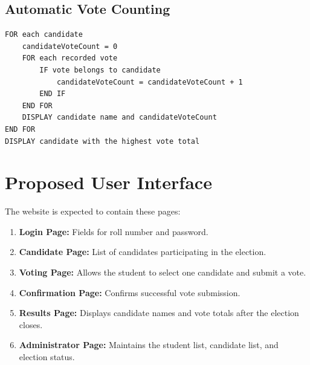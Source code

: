 \documentclass[12pt,a4paper]{report}
\begin{document}
\section{Automatic Vote Counting}
\begin{lstlisting}
FOR each candidate
    candidateVoteCount = 0
    FOR each recorded vote
        IF vote belongs to candidate
            candidateVoteCount = candidateVoteCount + 1
        END IF
    END FOR
    DISPLAY candidate name and candidateVoteCount
END FOR
DISPLAY candidate with the highest vote total
\end{lstlisting}

\chapter{Proposed User Interface}
The website is expected to contain these pages:
\begin{enumerate}
\item \textbf{Login Page:} Fields for roll number and password.
\item \textbf{Candidate Page:} List of candidates participating in the election.
\item \textbf{Voting Page:} Allows the student to select one candidate and submit a vote.
\item \textbf{Confirmation Page:} Confirms successful vote submission.
\item \textbf{Results Page:} Displays candidate names and vote totals after the election closes.
\item \textbf{Administrator Page:} Maintains the student list, candidate list, and election status.
\end{enumerate}
\end{document}
